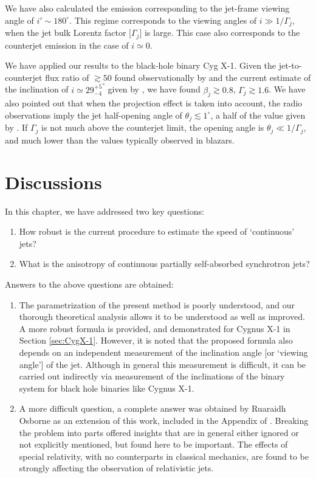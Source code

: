 We have also calculated the emission corresponding to the jet-frame viewing angle of $i' \sim 180^{\circ}$. This regime corresponds to the viewing angles of $i \gg 1/\Gamma_j$, when the jet bulk Lorentz factor [$\Gamma_j$] is large. This case also corresponds to the counterjet emission in the case of $i \simeq 0$.

We have applied our results to the black-hole binary Cyg X-1. Given the jet-to-counterjet flux ratio of $\gtrsim 50$ found observationally by  and the current estimate of the inclination of $i \simeq {29^{+5}_{-4}}^{\circ}$ given by , we have found $\beta_j \gtrsim 0.8 $, $ \Gamma_j \gtrsim 1.6$. We have also pointed out that when the projection effect is taken into account, the radio observations imply the jet half-opening angle of $\theta_j \lesssim 1^{\circ}$, a half of the value given by . If $\Gamma_j$ is not much above the counterjet limit, the opening angle is $\theta_j \ll 1/\Gamma_j$, and much lower than the values typically observed in blazars.



\section{Discussions}
\label{sec:discussions--jet_model}
In this chapter, we have addressed two key questions:
\begin{enumerate}
\item How robust is the current procedure to estimate the speed of `continuous' jets?
\item What is the anisotropy of continuous partially self-absorbed synchrotron jets?
\end{enumerate}

Answers to the above questions are obtained:
\begin{enumerate}
\item The parametrization of the present method is poorly understood, and our thorough theoretical analysis allows it to be understood as well as improved. A more robust formula is provided, and demonstrated for Cygnus X-1 in Section \ref{sec:CygX-1}. However, it is noted that the proposed formula also depends on an independent measurement of the inclination angle [or `viewing angle'] of the jet. Although in general this measurement is difficult, it can be carried out indirectly via measurement of the inclinations of the binary system for black hole binaries like Cygnus X-1.

\item A more difficult question, a complete answer was obtained by Ruaraidh Osborne as an extension of this work, included in the Appendix of \cite{Zdziarski_et_al.-2016-MNRAS}. Breaking the problem into parts offered insights that are in general either ignored or not explicitly mentioned, but found here to be important. The effects of special relativity, with no counterparts in classical mechanics, are found to be strongly affecting the observation of relativistic jets.
\end{enumerate}



